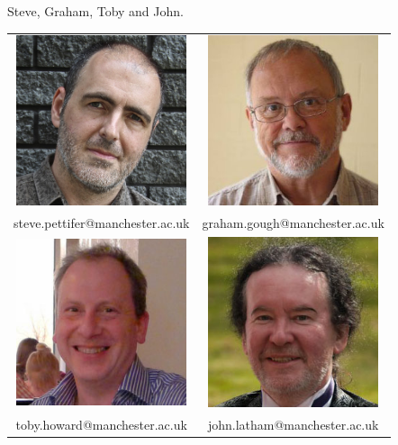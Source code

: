 Steve, Graham, Toby and John.

\vspace{1.5cm}
\begin{table}[h]
\centering
\begin{tabular}{cc}
\includegraphics[width=5cm]{images/srp-mugshot} & \includegraphics[width=5cm]{images/gdg-mugshot} \\
{\small steve.pettifer@manchester.ac.uk} & {\small graham.gough@manchester.ac.uk} \\
\includegraphics[width=5cm]{images/tljh-mugshot} & \includegraphics[width=5cm]{images/jtl-mugshot3.jpg} \\
{\small toby.howard@manchester.ac.uk}  & {\small john.latham@manchester.ac.uk} \\
\end{tabular}
\end{table}

